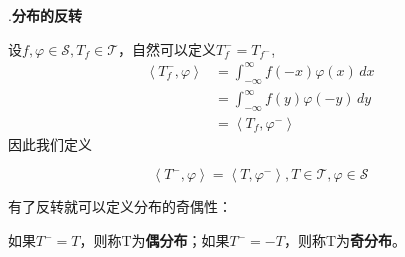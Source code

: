 \documentclass{ctexbook}
\begin{document}
.\textbf{分布的反转}

设$f,\varphi\in\mathcal{S} ,T_f\in\mathcal{T} $，自然可以定义$T_f^-=T_{f^-}$,
\begin{align*}
    \left\langle T_f^-,\varphi\right\rangle & =\int_{-\infty}^{\infty}f(-x)\varphi(x)\,dx \\
                                 & =\int_{-\infty}^{\infty}f(y)\varphi(-y)\,dy \\
                                 & =\left\langle T_f,\varphi^-\right\rangle
\end{align*}
因此我们定义\begin{definition}[分布的反转]
    \begin{equation*}
    \left\langle T^-,\varphi\right\rangle=\left\langle T,\varphi^-\right\rangle,T\in\mathcal{T} ,\varphi\in\mathcal{S}
\end{equation*}
\end{definition}

有了反转就可以定义分布的奇偶性：
\begin{definition}[分布的奇偶性]
    如果$T^-=T$，则称T为\textbf{偶分布}；如果$T^-=-T$，则称T为\textbf{奇分布}。
\end{definition}
\end{document}
